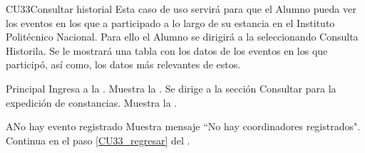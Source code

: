 \begin{UseCase}{CU33}{Consultar historial}{
		\noindent Esta caso de uso servirá para que el Alumno pueda ver los eventos en los que a participado a lo largo de su estancia en el Instituto Politécnico Nacional.
		Para ello el Alumno se dirigirá a la  seleccionando Consulta Historila. Se le mostrará una tabla con los datos de los eventos en los que participó, así como, los datos más relevantes de estos.
	} \label{CU33_evento}

		\end{UseCase}
	
    \begin{UCtrayectoria}{Principal}
    \UCpaso[\UCactor] Ingresa a la .
    \UCpaso Muestra la . \label{CU33_regresar}
    \UCpaso[\UCactor] Se dirige a la sección Consultar para la expedición de constancias.  
    \UCpaso Muestra la . 
    \end{UCtrayectoria}
    
    \begin{UCtrayectoriaA}{A}{No hay evento registrado}
    	\UCpaso Muestra mensaje “No hay coordinadores registrados".
    	\UCpaso Continua en el paso \ref{CU33_regresar} del .
    \end{UCtrayectoriaA}


	


